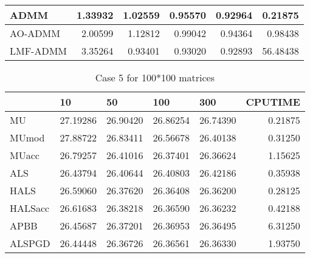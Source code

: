 \documentclass{article}
\begin{document}
\begin{table}[H]
\begin{tabular}{|l|r|r|r|r|r|}
		ADMM     & 1.33932                      & 1.02559                      & 0.95570                      & 0.92964                      & 0.21875                      \\ \hline
		AO-ADMM  & 2.00599                      & 1.12812                      & 0.99042                      & 0.94364                      & 0.98438                      \\ \hline
		LMF-ADMM & 3.35264                      & 0.93401                      & 0.93020                      & 0.92893                      & 56.48438                     \\ \hline
	\end{tabular}
\end{table}

 \begin{table}[H]
 		\caption{Case 5 for 100*100 matrices}
 	\centering
 	\begin{tabular}{|l|r|r|r|r|r|}
 		\hline
 		& \multicolumn{1}{l|}{10} & \multicolumn{1}{l|}{50} & \multicolumn{1}{l|}{100} & \multicolumn{1}{l|}{300} & \multicolumn{1}{l|}{CPUTIME} \\ \hline
 		MU       & 27.19286                & 26.90420                & 26.86254                 & 26.74390                 & 0.21875                      \\ \hline
 		MUmod    & 27.88722                & 26.83411                & 26.56678                 & 26.40138                 & 0.31250                      \\ \hline
 		MUacc    & 26.79257                & 26.41016                & 26.37401                 & 26.36624                 & 1.15625                      \\ \hline
 		ALS      & 26.43794                & 26.40644                & 26.40803                 & 26.42186                 & 0.35938                      \\ \hline
 		HALS     & 26.59060                & 26.37620                & 26.36408                 & 26.36200                 & 0.28125                      \\ \hline
 		HALSacc  & 26.61683                & 26.38218                & 26.36590                 & 26.36232                 & 0.42188                      \\ \hline
 		APBB     & 26.45687                & 26.37201                & 26.36953                 & 26.36495                 & 6.31250                      \\ \hline
 		ALSPGD   & 26.44448                & 26.36726                & 26.36561                 & 26.36330                 & 1.93750                      \\ \hline

\end{tabular}
\end{table}
\end{document}

